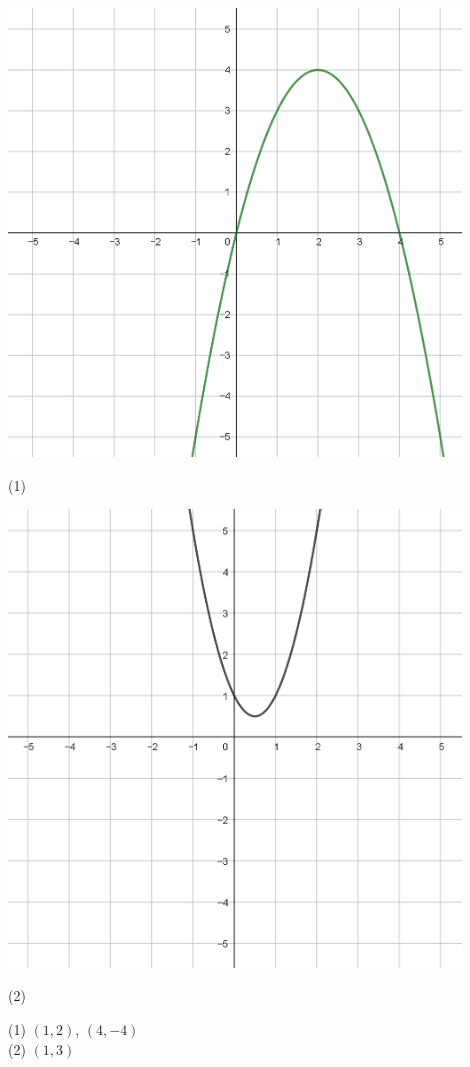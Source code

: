 \documentclass{oblivoir}
\begin{document}
\begin{minipage}{0.49\textwidth}
\begin{center}
\includegraphics[width=0.9\textwidth]{y=-x^2+4x}
\par
(1)
\end{center}

\begin{center}
\includegraphics[width=0.9\textwidth]{y=2x^2-2x+1}
\par
(2)
\end{center}

%
(1) \((1,2)\), \((4,-4)\)\\
(2) \((1,3)\)
\end{minipage}
\end{document}
